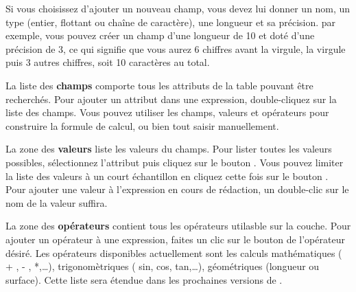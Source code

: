 Si vous choisissez d'ajouter un nouveau champ, vous devez lui donner un nom, un type (entier, flottant ou chaîne de caractère), une longueur et sa précision. par exemple, vous pouvez créer un champ d'une longueur de 10 et doté d'une précision de 3, ce qui signifie que vous aurez 6 chiffres avant la virgule, la virgule puis 3 autres chiffres, soit 10 caractères au total.

La liste des \textbf{champs} comporte tous les attributs de la table pouvant être recherchés. Pour ajouter un attribut dans une expression, double-cliquez sur la liste des champs. Vous pouvez utiliser les champs, valeurs et opérateurs pour construire la formule de calcul, ou bien tout saisir manuellement.

La zone des \textbf{valeurs} liste les valeurs du champs. Pour lister toutes les valeurs possibles, sélectionnez l'attribut puis cliquez sur le bouton . Vous pouvez limiter la liste des valeurs à un court échantillon en cliquez cette fois sur le bouton . Pour ajouter une valeur à l'expression en cours de rédaction, un double-clic sur le nom de la valeur suffira.

La zone des \textbf{opérateurs} contient tous les opérateurs utilasble sur la couche. Pour ajouter un opérateur à une expression, faites un clic sur le bouton de l'opérateur désiré. Les opérateurs disponibles actuellement sont les calculs mathématiques ( + , - , *,\dots), trigonomètriques ( sin, cos, tan,\dots), géométriques (longueur ou surface). Cette liste sera étendue dans les prochaines versions de \qg.

